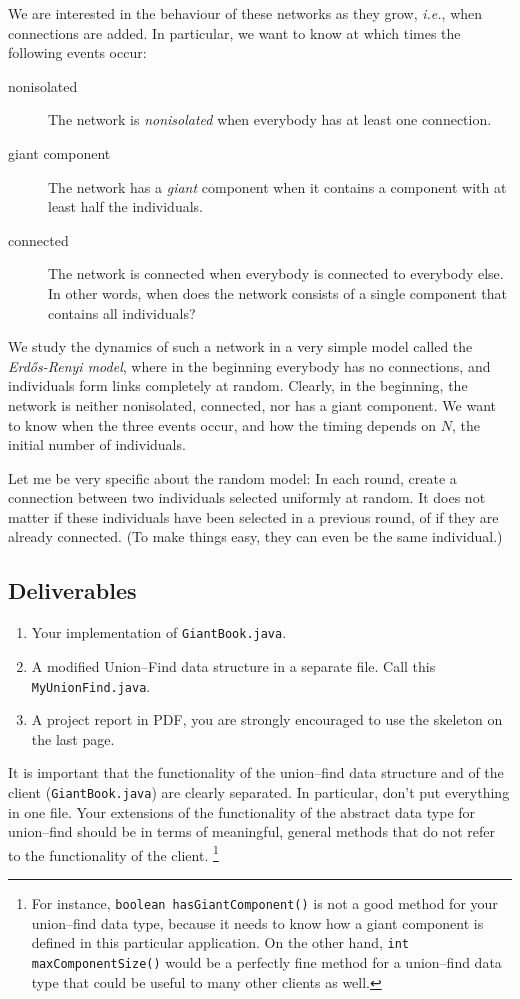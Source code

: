 \documentclass{tufte-handout}
\begin{document}
We are interested in the behaviour of these networks as they grow, \emph{i.e.},
when connections are added.
In particular, we want to know at which times the following events occur:
\begin{description}
\item[nonisolated]
  The network is \emph{nonisolated} when everybody has at least one connection.
\item[giant component] The network has a \emph{giant} component when
  it contains a component with at least half the individuals.
\item[connected] The network is connected when everybody is connected
  to everybody else.
  In other words, when does the network consists of a single component that contains all  individuals?
\end{description}
  We study the dynamics of such a network in a very simple model
  called the \emph{Erd\H{o}s-Renyi model}, where in the beginning everybody has
  no connections, and individuals form links completely at random.
  Clearly, in the beginning, the network is neither nonisolated,
  connected, nor has a giant component.
  We want to know when the three events occur, and how the timing
  depends on $N$, the initial number of individuals.

  Let me be very specific about the random model: In each round,
  create a connection between two individuals selected uniformly at
  random.
  It does not matter if these individuals have been selected in a
  previous round, of if they are already connected.
  (To make things easy, they can even be the same individual.)

\subsection{Deliverables}
\begin{enumerate}
\item Your implementation of {\tt GiantBook.java}.
\item A modified Union--Find data structure in a separate file.
	Call this {\tt MyUnionFind.java}. 
\item A project report in PDF, you are strongly encouraged to use the skeleton on the last page.
\end{enumerate}

It is important that the functionality of the union--find data
structure and of the client ({\tt GiantBook.java}) are clearly
separated.
In particular, don't put everything in one file.
Your extensions of the functionality of the abstract data type for
union--find should be in terms of meaningful, general methods that do not refer to the functionality of the client. 
\footnote{For instance, {\tt boolean hasGiantComponent()} is not a good method for your union--find data type, because it needs to know how a giant component is defined in this particular application. On the other hand, {\tt int maxComponentSize()} would be a perfectly fine method for a union--find data type that could be useful to many other clients as well.}
\end{document}
